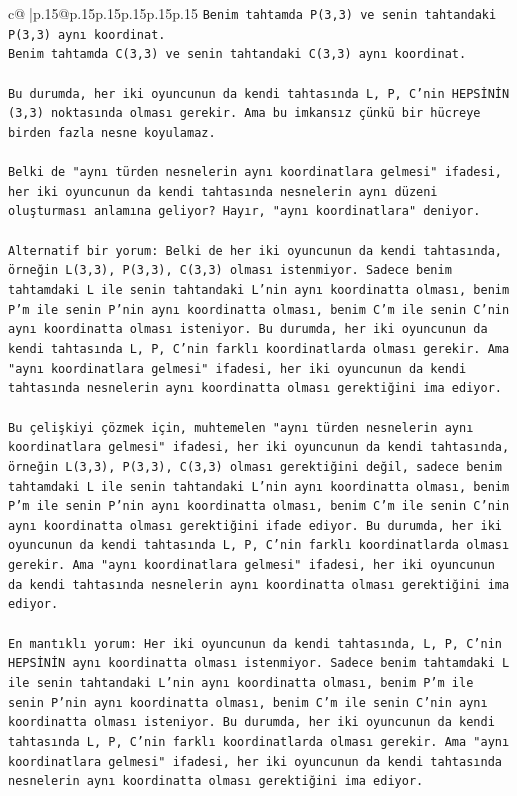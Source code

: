 \documentclass{article}
\begin{document}
{\begin{supertabular}{c@{$\;$}|p{.15\linewidth}@{}p{.15\linewidth}p{.15\linewidth}p{.15\linewidth}p{.15\linewidth}p{.15\linewidth}}
{{{\texttt{Benim tahtamda P(3,3) ve senin tahtandaki P(3,3) aynı koordinat.} \\
\texttt{Benim tahtamda C(3,3) ve senin tahtandaki C(3,3) aynı koordinat.} \\
\\ 
\texttt{Bu durumda, her iki oyuncunun da kendi tahtasında L, P, C'nin HEPSİNİN (3,3) noktasında olması gerekir. Ama bu imkansız çünkü bir hücreye birden fazla nesne koyulamaz.} \\
\\ 
\texttt{Belki de "aynı türden nesnelerin aynı koordinatlara gelmesi" ifadesi, her iki oyuncunun da kendi tahtasında nesnelerin aynı düzeni oluşturması anlamına geliyor? Hayır, "aynı koordinatlara" deniyor.} \\
\\ 
\texttt{Alternatif bir yorum: Belki de her iki oyuncunun da kendi tahtasında, örneğin L(3,3), P(3,3), C(3,3) olması istenmiyor. Sadece benim tahtamdaki L ile senin tahtandaki L'nin aynı koordinatta olması, benim P'm ile senin P'nin aynı koordinatta olması, benim C'm ile senin C'nin aynı koordinatta olması isteniyor. Bu durumda, her iki oyuncunun da kendi tahtasında L, P, C'nin farklı koordinatlarda olması gerekir. Ama "aynı koordinatlara gelmesi" ifadesi, her iki oyuncunun da kendi tahtasında nesnelerin aynı koordinatta olması gerektiğini ima ediyor.} \\
\\ 
\texttt{Bu çelişkiyi çözmek için, muhtemelen "aynı türden nesnelerin aynı koordinatlara gelmesi" ifadesi, her iki oyuncunun da kendi tahtasında, örneğin L(3,3), P(3,3), C(3,3) olması gerektiğini değil, sadece benim tahtamdaki L ile senin tahtandaki L'nin aynı koordinatta olması, benim P'm ile senin P'nin aynı koordinatta olması, benim C'm ile senin C'nin aynı koordinatta olması gerektiğini ifade ediyor. Bu durumda, her iki oyuncunun da kendi tahtasında L, P, C'nin farklı koordinatlarda olması gerekir. Ama "aynı koordinatlara gelmesi" ifadesi, her iki oyuncunun da kendi tahtasında nesnelerin aynı koordinatta olması gerektiğini ima ediyor.} \\
\\ 
\texttt{En mantıklı yorum: Her iki oyuncunun da kendi tahtasında, L, P, C'nin HEPSİNİN aynı koordinatta olması istenmiyor. Sadece benim tahtamdaki L ile senin tahtandaki L'nin aynı koordinatta olması, benim P'm ile senin P'nin aynı koordinatta olması, benim C'm ile senin C'nin aynı koordinatta olması isteniyor. Bu durumda, her iki oyuncunun da kendi tahtasında L, P, C'nin farklı koordinatlarda olması gerekir. Ama "aynı koordinatlara gelmesi" ifadesi, her iki oyuncunun da kendi tahtasında nesnelerin aynı koordinatta olması gerektiğini ima ediyor.} \\
}}}
\end{supertabular}}
\end{document}
